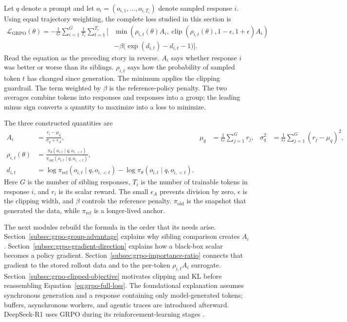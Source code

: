 Let $q$ denote a prompt and let
$o_i=(o_{i,1},\ldots,o_{i,T_i})$ denote sampled response $i$. Using equal trajectory
weighting, the complete loss studied in this section is
\begin{equation}
  \begin{aligned}
  \mathcal{L}_{\mathrm{GRPO}}(\theta)
  =-\frac{1}{G}\sum_{i=1}^{G}\frac{1}{T_i}\sum_{t=1}^{T_i}
  \Big[&\min\!\left(
      \rho_{i,t}(\theta)A_i,
      \operatorname{clip}(\rho_{i,t}(\theta),1-\epsilon,1+\epsilon)A_i
    \right) \\
    &-\beta\big(\exp(d_{i,t})-d_{i,t}-1\big)\Big].
  \end{aligned}
  \label{eq:grpo-full-loss}
\end{equation}
Read the equation as the preceding story in reverse. $A_i$ says whether response $i$ was
better or worse than its siblings. $\rho_{i,t}$ says how the probability of sampled token
$t$ has changed since generation. The minimum applies the clipping guardrail. The term
weighted by $\beta$ is the reference-policy penalty. The two averages combine tokens into
responses and responses into a group; the leading minus sign converts a quantity to
maximize into a loss to minimize.

The three constructed quantities are
\begin{align}
  A_i
  &=\frac{r_i-\mu_q}{\sigma_q+\epsilon_A},
  &\mu_q&=\frac{1}{G}\sum_{j=1}^{G}r_j,
  &\sigma_q^2&=\frac{1}{G}\sum_{j=1}^{G}(r_j-\mu_q)^2,
  \label{eq:grpo-overview-advantage}\\
  \rho_{i,t}(\theta)
  &=\frac{\pi_\theta(o_{i,t}\mid q,o_{i,<t})}
          {\pi_{\mathrm{old}}(o_{i,t}\mid q,o_{i,<t})},
  \label{eq:grpo-overview-ratio}\\
  d_{i,t}
  &=\log\pi_{\mathrm{ref}}(o_{i,t}\mid q,o_{i,<t})
    -\log\pi_\theta(o_{i,t}\mid q,o_{i,<t}).
  \label{eq:grpo-overview-kl-difference}
\end{align}
Here $G$ is the number of sibling responses, $T_i$ is the number of trainable tokens in
response $i$, and $r_i$ is its scalar reward. The small $\epsilon_A$ prevents division by
zero, $\epsilon$ is the clipping width, and $\beta$ controls the reference penalty.
$\pi_{\mathrm{old}}$ is the snapshot that generated the data, while
$\pi_{\mathrm{ref}}$ is a longer-lived anchor.

The next modules rebuild the formula in the order that its needs arise.
Section~\ref{subsec:grpo-group-advantage} explains why sibling comparison creates $A_i$.
Section~\ref{subsec:grpo-gradient-direction} explains how a black-box scalar becomes a
policy gradient. Section~\ref{subsec:grpo-importance-ratio} connects that gradient to the
stored rollout data and to the per-token $\rho_{i,t}A_i$ surrogate.
Section~\ref{subsec:grpo-clipped-objective} motivates clipping and KL before reassembling
Equation~\ref{eq:grpo-full-loss}. The foundational explanation assumes synchronous
generation and a response containing only model-generated tokens; buffers, asynchronous
workers, and agentic traces are introduced afterward. DeepSeek-R1 uses GRPO during its
reinforcement-learning stages \citep{guo2025deepseekr1}.
